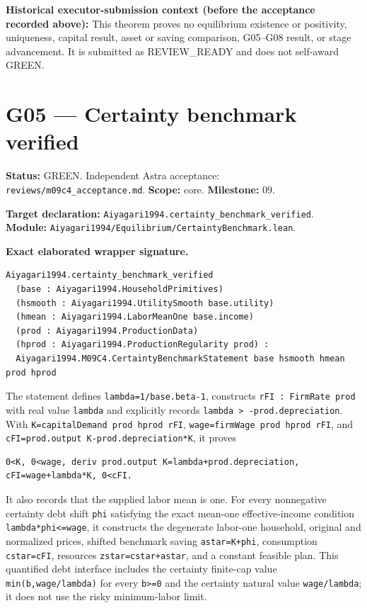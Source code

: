 \documentclass[
  11pt,
]{article}
\let\LedgerOriginalTexttt\texttt
\renewcommand{\texttt}[1]{{\small\LedgerOriginalTexttt{#1}}}
\begin{document}
\textbf{Historical executor-submission context (before the acceptance
recorded above):} This theorem proves no equilibrium existence or
positivity, uniqueness, capital result, asset or saving comparison,
G05--G08 result, or stage advancement. It is submitted as REVIEW\_READY
and does not self-award GREEN.

\section{G05 --- Certainty benchmark
verified}\label{g05-certainty-benchmark-verified}

\textbf{Status:} GREEN. Independent Astra acceptance:
\texttt{reviews/m09c4\_acceptance.md}. \textbf{Scope:} core.
\textbf{Milestone:} 09.

\textbf{Target declaration:}
\texttt{Aiyagari1994.certainty\_benchmark\_verified}.\\
\textbf{Module:}
\texttt{Aiyagari1994/Equilibrium/CertaintyBenchmark.lean}.

\textbf{Exact elaborated wrapper signature.}

\begin{verbatim}
Aiyagari1994.certainty_benchmark_verified
  (base : Aiyagari1994.HouseholdPrimitives)
  (hsmooth : Aiyagari1994.UtilitySmooth base.utility)
  (hmean : Aiyagari1994.LaborMeanOne base.income)
  (prod : Aiyagari1994.ProductionData)
  (hprod : Aiyagari1994.ProductionRegularity prod) :
  Aiyagari1994.M09C4.CertaintyBenchmarkStatement base hsmooth hmean prod hprod
\end{verbatim}

The statement defines \texttt{lambda=1/base.beta-1}, constructs
\texttt{rFI\ :\ FirmRate\ prod} with real value \texttt{lambda} and
explicitly records \texttt{lambda\ \textgreater{}\ -prod.depreciation}.
With \texttt{K=capitalDemand\ prod\ hprod\ rFI},
\texttt{wage=firmWage\ prod\ hprod\ rFI}, and
\texttt{cFI=prod.output\ K-prod.depreciation*K}, it proves

\begin{verbatim}
0<K, 0<wage, deriv prod.output K=lambda+prod.depreciation,
cFI=wage+lambda*K, 0<cFI.
\end{verbatim}

It also records that the supplied labor mean is one. For every
nonnegative certainty debt shift \texttt{phi} satisfying the exact
mean-one effective-income condition \texttt{lambda*phi\textless{}=wage},
it constructs the degenerate labor-one household, original and
normalized prices, shifted benchmark saving \texttt{astar=K+phi},
consumption \texttt{cstar=cFI}, resources \texttt{zstar=cstar+astar},
and a constant feasible plan. This quantified debt interface includes
the certainty finite-cap value \texttt{min(b,wage/lambda)} for every
\texttt{b\textgreater{}=0} and the certainty natural value
\texttt{wage/lambda}; it does not use the risky minimum-labor limit.
\end{document}

